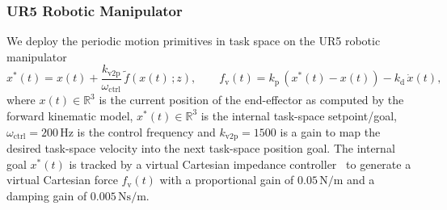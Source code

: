 \subsubsection{UR5 Robotic Manipulator}
We deploy the periodic motion primitives in task space on the UR5 robotic manipulator
\begin{equation}
    x^*(t) = x(t) + \frac{k_\mathrm{v2p}}{\omega_\mathrm{ctrl}} \, \tilde{f}(x(t) \, ; z),
    \qquad
    f_\mathrm{v}(t) = k_\mathrm{p} \, (x^*(t) - x(t)) - k_\mathrm{d} \, \dot{x}(t),
\end{equation}
where $x(t) \in \mathbb{R}^3$ is the current position of the end-effector as computed by the forward kinematic model, $x^*(t) \in \mathbb{R}^3$ is the internal task-space setpoint/goal, $\omega_\mathrm{ctrl} = 200 \, \mathrm{Hz}$ is the control frequency and $k_\mathrm{v2p} = 1500$ is a gain to map the desired task-space velocity into the next task-space position goal.
The internal goal $x^*(t)$ is tracked by a virtual Cartesian impedance controller~\citep{scherzinger2017forward} to generate a virtual Cartesian force $f_\mathrm{v}(t)$ with a proportional gain of $0.05 \, \mathrm{N/m}$ and a damping gain of $0.005 \, \mathrm{Ns/m}$.


